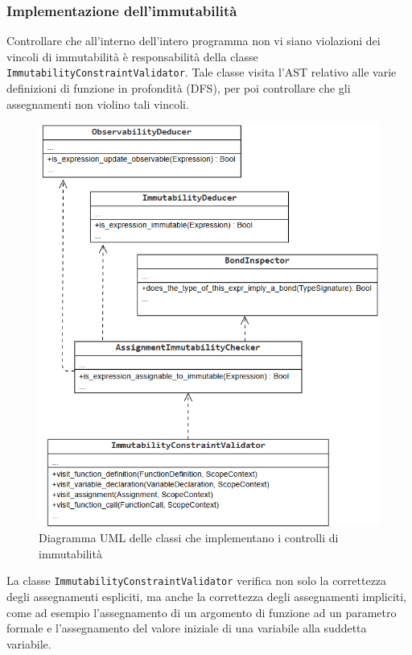 \subsubsection{Implementazione dell'immutabilità}
Controllare che all'interno dell'intero programma non vi siano violazioni dei vincoli di 
immutabilità è responsabilità della classe \texttt{ImmutabilityConstraintValidator}. Tale 
classe visita l'AST relativo alle varie definizioni di funzione in profondità (DFS), per poi 
controllare che gli assegnamenti non violino tali vincoli. \\

\begin{figure}[H]
    \centering
        \includegraphics[scale=0.7]{../../Assets/ImmutabilityUML.png}
    \caption{Diagramma UML delle classi che implementano i controlli di immutabilità}
\end{figure}
\vspace{0.5cm}

La classe \texttt{ImmutabilityConstraintValidator} verifica non solo la correttezza degli assegnamenti 
espliciti, ma anche la correttezza degli assegnamenti impliciti, come ad esempio l'assegnamento di un 
argomento di funzione ad un parametro formale e l'assegnamento del valore iniziale di una variabile alla 
suddetta variabile. \\

